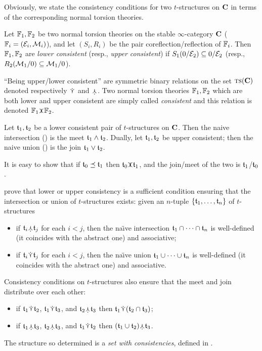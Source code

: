 Obviously, we state the consistency conditions for two $t$\hyp{}structures on $\mathbf{C}$ in terms of the corresponding normal torsion theories.
\begin{definition}
Let $\mathbb{F}_1, \mathbb{F}_2$ be two normal torsion theories on the stable $\infty$\hyp{}category $\mathbf{C}$ ($\mathbb{F}_i = (\mathcal{E}_i,\mathcal{M}_i)$), and let $(S_i, R_i)$ be the pair coreflection\fshyp{}reflection of $\mathbb{F}_i$. Then $\mathbb{F}_1, \mathbb{F}_2$ are \emph{lower consistent} (resp., \emph{upper consistent}) if $S_1(0/\mathcal{E}_2)\subseteq 0/\mathcal{E}_2$ (resp., $R_2(\mathcal{M}_1/0)\subseteq \mathcal{M}_1/0$).

``Being upper\fshyp{}lower consistent'' are symmetric binary relations on the set $\text{\scshape ts}(\mathbf{C})$ denoted respectively $\upcons$ and $\lowcons$. Two normal torsion theories $\mathbb{F}_1,\mathbb{F}_2$ which are both lower and upper consistent are simply called \emph{consistent} and this relation is denoted $\fF_1\cons \fF_2$.
\end{definition}
\begin{proposition}
Let $\mathfrak{t}_1,\mathfrak{t}_2$ be a lower consistent pair of $t$\hyp{}structures on $\mathbf{C}$. Then the naive intersection () is the meet $\mathfrak{t}_1\land \mathfrak{t}_2$. Dually, let $\mathfrak{t}_1,\mathfrak{t}_2$ be upper consistent; then the naive union () is the join $\mathfrak{t}_1\vee\mathfrak{t}_2$.
\end{proposition}
\begin{remark}
It is easy to show that if $\mathfrak{t}_0\preceq \mathfrak{t}_1$ then $\tee_0\cons\tee_1$, and the join\fshyp{}meet of the two is $\mathfrak{t}_1$\fshyp{}$\mathfrak{t}_0$.
\end{remark}
\begin{remark}
\cite[\aprop \textbf{5}, \textbf{6}]{bondal2013operations} prove that lower or upper consistency is a sufficient condition ensuring that the intersection or union of $t$\hyp{}structures exists: given an $n$\hyp{}tuple $\{\mathfrak{t}_1,\dots, \mathfrak{t}_n\}$ of $t$\hyp{}structures
\begin{itemize}
\item if $\tee_i\lowcons \tee_j$ for each $i<j$, then the na\"{\i}ve intersection $\mathfrak{t}_1\cap \dots\cap \mathfrak{t}_n$ is well\hyp{}defined (it coincides with the abstract one) and associative;
\item if $\tee_i\upcons \tee_j$ for each $i<j$, then the na\"{\i}ve union $\mathfrak{t}_1\cup \dots\cup \mathfrak{t}_n$ is well\hyp{}defined (it coincides with the abstract one) and associative.
\end{itemize}
Consistency conditions on $t$\hyp{}structures also ensure that the meet and join distribute over each other:
\begin{itemize}
\item if $\tee_1\upcons \tee_2$, $\tee_1\upcons \tee_3$, and $\tee_2\lowcons \tee_3$ then $\tee_1\upcons (\tee_2\cap \tee_3)$;
\item if $\tee_1\lowcons \tee_3$, $\tee_2\lowcons \tee_3$, and $\tee_1\upcons \tee_2$ then $(\tee_1\cup \tee_2)\lowcons \tee_3$.
\end{itemize}
\end{remark}
The structure so determined is a \emph{set with consistencies}, defined in \cite[\S\textbf{2.1}]{bondal2013operations}.
